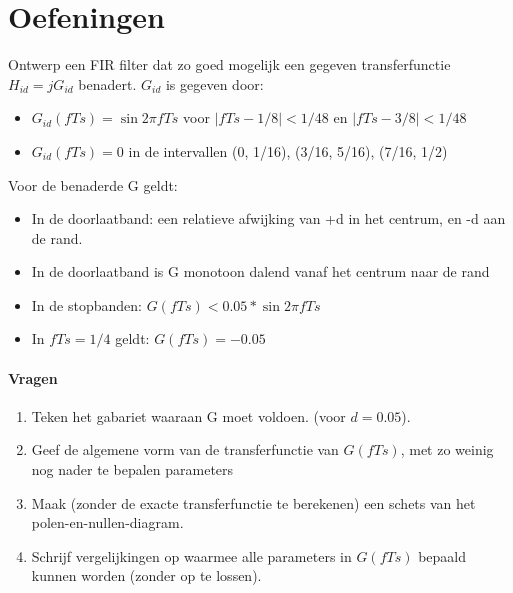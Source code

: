 \documentclass[a4paper]{article}
\begin{document}
\section{Oefeningen}
Ontwerp een FIR filter dat zo goed mogelijk een gegeven transferfunctie $H_{id} = jG_{id}$ benadert.
$G_{id}$ is gegeven door:
\begin{itemize}
	\item $G_{id}(fTs)=\sin{2\pi fTs}$ voor $|fTs-1/8|<1/48$ en $|fTs-3/8|<1/48$
	\item $G_{id}(fTs)=0$ in de intervallen (0, 1/16), (3/16, 5/16), (7/16, 1/2)
\end{itemize}

\noindent Voor de benaderde G geldt:
\begin{itemize}
	\item In de doorlaatband: een relatieve afwijking van +d in het centrum, en -d aan de rand.
	\item In de doorlaatband is G monotoon dalend vanaf het centrum naar de rand
	\item In de stopbanden: $G(fTs) < 0.05*\sin{2\pi fTs}$
	\item In $fTs = 1/4$ geldt: $G(fTs) = -0.05$
\end{itemize}
\paragraph{Vragen}
\begin{enumerate}
	\item Teken het gabariet waaraan G moet voldoen. (voor $d=0.05$).
	\item Geef de algemene vorm van de transferfunctie van $G(fTs)$, met zo weinig nog nader te bepalen parameters
	\item Maak (zonder de exacte transferfunctie te berekenen) een schets van het polen-en-nullen-diagram.
	\item Schrijf vergelijkingen op waarmee alle parameters in $G(fTs)$ bepaald kunnen worden (zonder op te lossen).
\end{enumerate}
\end{document}
